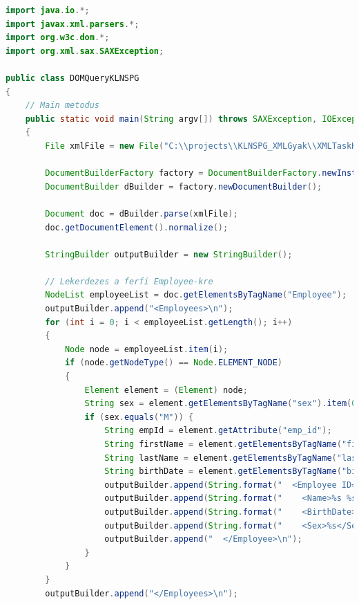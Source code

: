 \documentclass[12pt]{report}
\begin{document}
\begin{lstlisting}[caption={DOMQueryKLNSPG.java} adatlekérdező program, language=Java]
import java.io.*;
import javax.xml.parsers.*;
import org.w3c.dom.*;
import org.xml.sax.SAXException;

public class DOMQueryKLNSPG
{
	// Main metodus
	public static void main(String argv[]) throws SAXException, IOException, ParserConfigurationException 
	{
		File xmlFile = new File("C:\\projects\\KLNSPG_XMLGyak\\XMLTaskKLNSPG\\XMLKLNSPG.xml");
		
		DocumentBuilderFactory factory = DocumentBuilderFactory.newInstance();
		DocumentBuilder dBuilder = factory.newDocumentBuilder();
		
		Document doc = dBuilder.parse(xmlFile);
		doc.getDocumentElement().normalize();
		
		StringBuilder outputBuilder = new StringBuilder();
		
		// Lekerdezes a ferfi Employee-kre
		NodeList employeeList = doc.getElementsByTagName("Employee");
		outputBuilder.append("<Employees>\n");
		for (int i = 0; i < employeeList.getLength(); i++) 
		{
			Node node = employeeList.item(i);
			if (node.getNodeType() == Node.ELEMENT_NODE) 
			{
				Element element = (Element) node;
				String sex = element.getElementsByTagName("sex").item(0).getTextContent();
				if (sex.equals("M")) {
					String empId = element.getAttribute("emp_id");
					String firstName = element.getElementsByTagName("first_name").item(0).getTextContent();
					String lastName = element.getElementsByTagName("last_name").item(0).getTextContent();
					String birthDate = element.getElementsByTagName("birth_date").item(0).getTextContent();
					outputBuilder.append(String.format("  <Employee ID=\"%s\">\n", empId));
					outputBuilder.append(String.format("    <Name>%s %s</Name>\n", firstName, lastName));
					outputBuilder.append(String.format("    <BirthDate>%s</BirthDate>\n", birthDate));
					outputBuilder.append(String.format("    <Sex>%s</Sex>\n", sex));
					outputBuilder.append("  </Employee>\n");
				}
			}
		}
		outputBuilder.append("</Employees>\n");
		

\end{lstlisting}
\end{document}
